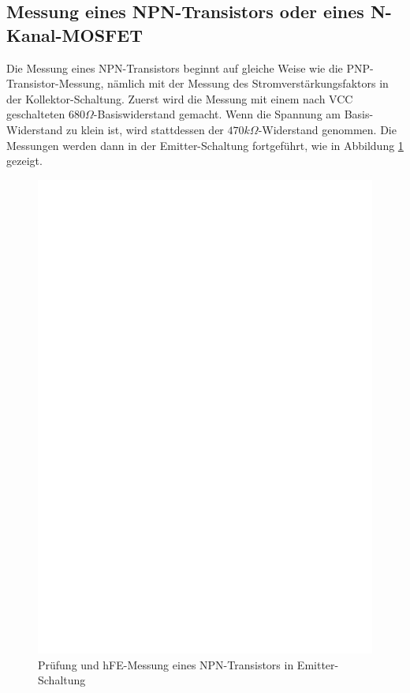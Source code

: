 \subsection{Messung eines NPN-Transistors oder eines N-Kanal-MOSFET}
Die Messung eines NPN-Transistors beginnt auf gleiche Weise wie die PNP-Transistor-Messung, nämlich
mit der Messung des Stromverstärkungsfaktors in der Kollektor-Schaltung.
Zuerst wird die Messung mit einem nach VCC geschalteten \(680\Omega\)-Basiswiderstand gemacht.
Wenn die Spannung am Basis-Widerstand zu klein ist, wird stattdessen der \(470k\Omega\)-Widerstand genommen.
Die Messungen werden dann in der Emitter-Schaltung fortgeführt, wie in Abbildung \ref{fig:npnce} gezeigt.
\begin{figure}[H]
\centering
\includegraphics[]{../FIG/NPNce.eps}
\caption{Prüfung und hFE-Messung eines NPN-Transistors in Emitter-Schaltung}
\label{fig:npnce}
\end{figure}
